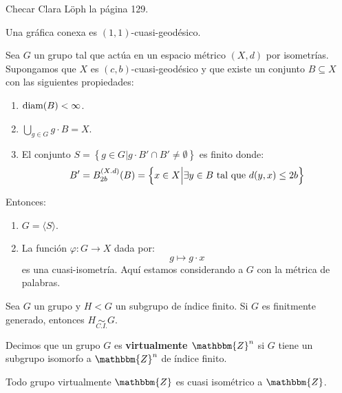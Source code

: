 \documentclass[12pt]{report}
\newcounter{it}
\theoremstyle{largebreak}
\newcommand\cf[3]{\ensuremath{#1:#2\rightarrow#3}}
\newcommand{\bbm}[1]{\ensuremath{\mathbbm{#1}}}
\newcommand{\gen}[1]{\ensuremath{\langle#1\rangle}}
\newcommand{\qisom}{\ensuremath{\underset{C.I.}{\sim}}}
\begin{document}
    Checar Clara Löph la página 129.

    \begin{propo}
        Una gráfica conexa es $(1,1)$-cuasi-geodésico.
    \end{propo}

    \begin{theor}
        Sea $G$ un grupo tal que actúa en un espacio métrico $(X,d)$ por isometrías. Supongamos que $X$ es $(c,b)$-cuasi-geodésico y que existe un conjunto $B\subseteq X$ con las siguientes propiedades:
        \begin{enumerate}[label = \textit{(\alph*)}]
            \item $\textup{diam}(B)<\infty$.
            \item $\bigcup_{ g\in G}g\cdot B=X$.
            \item El conjunto $S=\left\{g\in G\Big|g\cdot B'\cap B'\neq\emptyset \right\}$ es finito donde:
            \begin{equation*}
                B'=B_{ 2b}^{(X.d)}(B)=\left\{x\in X\Big|\exists y\in B\textup{ tal que }d(y,x)\leq 2b \right\}
            \end{equation*}
        \end{enumerate}
        Entonces:
        \begin{enumerate}[label = \textit{(\arabic*)}]
            \item $G=\gen{S}$.
            \item La función $\cf{\varphi}{G}{X}$ dada por:
            \begin{equation*}
                g\mapsto g\cdot x
            \end{equation*}
            es una cuasi-isometría. Aquí estamos considerando a $G$ con la métrica de palabras.
        \end{enumerate}
    \end{theor}

    \begin{cor}
        Sea $G$ un grupo y $H<G$ un subgrupo de índice finito. Si $G$ es finitmente generado, entonces $H\qisom G$. 
    \end{cor}

    \begin{mydef}
        Decimos que un grupo $G$ es \textbf{virtualmente $\bbm{Z}^n$} si $G$ tiene un subgrupo isomorfo a $\bbm{Z}^n$ de índice finito.
    \end{mydef}

    \begin{theor}
        Todo grupo virtualmente $\bbm{Z}$ es cuasi isométrico a $\bbm{Z}$.
    \end{theor}
\end{document}
